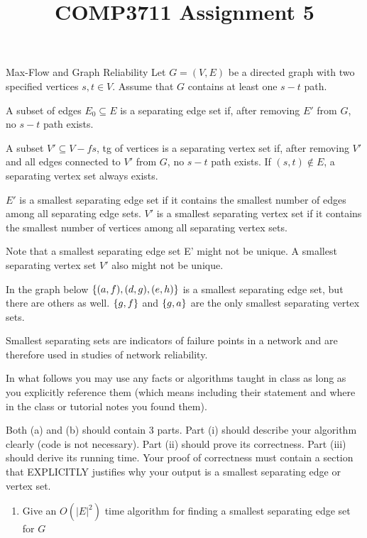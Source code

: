 \documentclass{article}
\title{COMP3711 Assignment 5}
\numberwithin{table}{section}
\numberwithin{figure}{section}
\begin{document}
\maketitle

\begin{section}{Max-Flow and Graph Reliability}
Let $G = (V, E)$ be a directed graph with two specified vertices $s, t \in V$. Assume that $G$ contains at least one $s-t$ path.

A subset of edges $E_0 \subseteq E$ is a separating edge set if, after removing $E'$ from $G$, no $s-t$ path exists.

A subset $V' \subseteq V - fs$, tg of vertices is a separating vertex set if, after    removing $V'$ and all edges connected to $V'$ from $G$, no $s-t$ path exists. If $(s, t) \notin E$, a separating vertex set always exists.

$E'$ is a smallest separating edge set if it contains the smallest number of edges among all separating edge sets. $V'$ is a smallest separating vertex set if it contains the smallest number of vertices among all separating vertex sets.

Note that a smallest separating edge set E' might not be unique. A smallest separating vertex set $V'$ also might not be unique.

In the graph below $\left\{(a, f), (d, g), (e, h)\right\}$ is a smallest separating edge set, but there are others as well.  $\left\{g,f\right\}$ and $\left\{g,a\right\}$ are the only smallest separating vertex sets.

Smallest separating sets are indicators of failure points in a network and are therefore used in studies of network reliability.

In what follows you may use any facts or algorithms taught in class as long as you explicitly reference them (which means including their statement and where in the class or tutorial notes you found them).

Both (a) and (b) should contain 3 parts. Part (i) should describe your algorithm clearly (code is not necessary). Part (ii) should prove its correctness. Part (iii) should derive its running time. Your proof of correctness must contain a section that EXPLICITLY justifies why your output is a smallest separating edge or vertex set.

\begin{enumerate}
    \newpage
    \item Give an $O(|E|^2)$ time algorithm for finding a smallest separating edge
    set for $G$


\end{enumerate}
\end{section}
\end{document}

